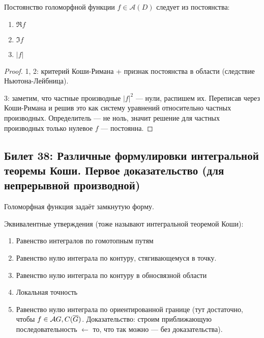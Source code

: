 \documentclass[12pt, a4paper, oneside]{memoir}
\begin{document}
\begin{theorem}
    Постоянство голоморфной функции $f \in \mathcal{A}(D)$ следует из постоянства:

    \begin{enumerate}
        \item $\Re f$
        \item $\Im f$
        \item $|f|$
    \end{enumerate}

    \begin{proof}
        1, 2: критерий Коши-Римана + признак постоянства в области (следствие Ньютона-Лейбница).

        3: заметим, что частные производные $|f|^2$ — нули, распишем их.
        Переписав через Коши-Римана и решив это как систему уравнений относительно частных производных.
        Определитель — не ноль, значит решение для частных производных только нулевое $f$ — постоянна.
    \end{proof}
\end{theorem}

\subsection{Билет 38: Различные формулировки интегральной теоремы Коши. Первое доказательство (для непрерывной производной)}

\begin{theorem}
     Голоморфная функция задаёт замкнутую форму.
\end{theorem}

Эквивалентные утверждения (тоже называют интегральной теоремой Коши):

\begin{enumerate}
    \item Равенство интегралов по гомотопным путям
    \item Равенство нулю интеграла по контуру, стягивающемуся в точку.
    \item Равенство нулю интеграла по контуру в обносвязной области
    \item Локальная точность
    \item Равенство нулю интеграла по ориентированной границе (тут достаточно, чтобы $f \in {\mathcal{A}}{G}, C(\overline{G})$. Доказательство: строим приближающую последовательность $←$ то, что так можно — без доказательства).
\end{enumerate}
\end{document}
